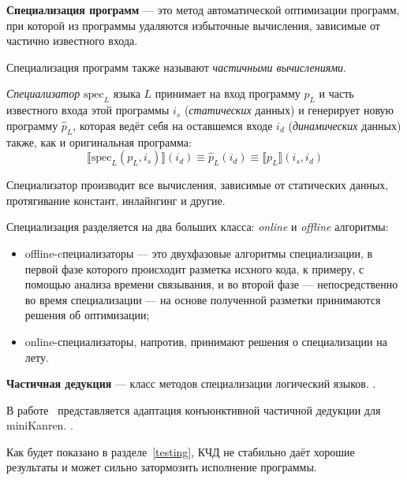 {\bf Специализация программ} --- это метод автоматической оптимизации программ,
при которой из программы удаляются избыточные вычисления, зависимые от частично известного входа.

Специализация программ также называют \emph{частичными вычислениями}\cite{jones}.

{\it Специализатор} $\text{spec}_L$ языка $L$ принимает на вход программу $p_L$ и часть известного входа этой
программы $i_s$ (\emph{статических} данных) и генерирует новую программу $\hat{p}_L$, которая ведёт себя на оставшемся
входе $i_d$ (\emph{динамических} данных) также, как и оригинальная программа:
\[
  \llbracket \text{spec}_L(p_L, i_s) \rrbracket (i_d) \equiv \hat{p}_L (i_d) \equiv \llbracket p_L \rrbracket (i_s, i_d)
\]

Специализатор производит все вычисления, зависимые от статических данных,
протягивание констант, инлайнгинг и другие.


Специализация разделяется на два больших класса: \emph{online} и \emph{offline} алгоритмы:
\begin{itemize}
\item offline-cпециализаторы --- это двухфазовые алгоритмы специализации, в первой фазе
которого происходит разметка исхного кода, к примеру, с помощью анализа времени связывания,
и во второй фазе --- непосредственно во время специализации --- на основе полученной
разметки принимаются решения об оптимизации;

\item online-специализаторы, напротив, принимают решения о специализации на лету.
\end{itemize}





{\bf Частичная дедукция} --- класс методов специализации логический языков\cite{advanced}.
.

В работе~\cite{lozov} представляется адаптация конъюнктивной частичной дедукции для miniKanren.
.

Как будет показано в разделе~\ref{testing}, КЧД не стабильно даёт хорошие результаты и
может сильно затормозить исполнение программы.
